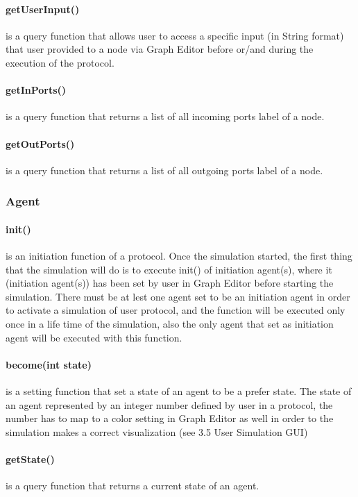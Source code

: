 \paragraph{getUserInput()} is a query function that allows user to access a specific input (in String format) that user provided to a node via Graph Editor before or/and during the execution of the protocol.

\paragraph{getInPorts()} is a query function that returns a list of all incoming ports label of a node.

\paragraph{getOutPorts()} is a query function that returns a list of all outgoing ports label of a node.


\subsubsection*{Agent}

\paragraph{init()} is an initiation function of a protocol. Once the simulation started, the first thing that the simulation will do is to execute init() of initiation agent(s), where it (initiation agent(s)) has been set by user in Graph Editor before starting the simulation. There must be at lest one agent set to be an initiation agent in order to activate a simulation of user protocol, and the function will be executed only once in a life time of the simulation, also the only agent that set as initiation agent will be executed with this function.


\paragraph{become(int state)} is a setting function that set a state of an agent to be a prefer state. The state of an agent represented by an integer number defined by user in a protocol, the number has to map to a color setting in Graph Editor as well in order to the simulation makes a correct visualization (see 3.5 User Simulation GUI)

\paragraph{getState()} is a query function that returns a current state of an agent.

